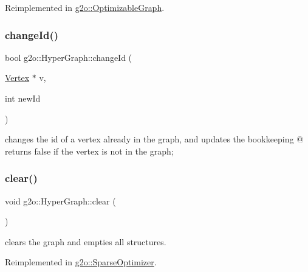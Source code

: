 Reimplemented in \mbox{\hyperlink{structg2o_1_1_optimizable_graph_ac6f41f49fe6148fbe17133d10bf29b4c}{g2o\+::\+Optimizable\+Graph}}.

\mbox{\label{classg2o_1_1_hyper_graph_a74f0d7392e67762a85799db72a58a94c}} 
\subsubsection{\texorpdfstring{change\+Id()}{changeId()}}
{\footnotesize\ttfamily bool g2o\+::\+Hyper\+Graph\+::change\+Id (\begin{DoxyParamCaption}\item[{\mbox{\hyperlink{classg2o_1_1_hyper_graph_1_1_vertex}{Vertex}} $\ast$}]{v,  }\item[{int}]{new\+Id }\end{DoxyParamCaption})\hspace{0.3cm}{\ttfamily [virtual]}}

changes the id of a vertex already in the graph, and updates the bookkeeping @ returns false if the vertex is not in the graph; \mbox{\label{classg2o_1_1_hyper_graph_a6b629dff2928dbd704ca81f24858e72f}} 
\subsubsection{\texorpdfstring{clear()}{clear()}}
{\footnotesize\ttfamily void g2o\+::\+Hyper\+Graph\+::clear (\begin{DoxyParamCaption}{ }\end{DoxyParamCaption})\hspace{0.3cm}{\ttfamily [virtual]}}



clears the graph and empties all structures. 



Reimplemented in \mbox{\hyperlink{classg2o_1_1_sparse_optimizer_a4881e4ac9ba9a58d4e249dc03ef9683d}{g2o\+::\+Sparse\+Optimizer}}.

\mbox{\label{classg2o_1_1_hyper_graph_a4edfd2ef4bf235cf78031c505cfd2fcc}} 
